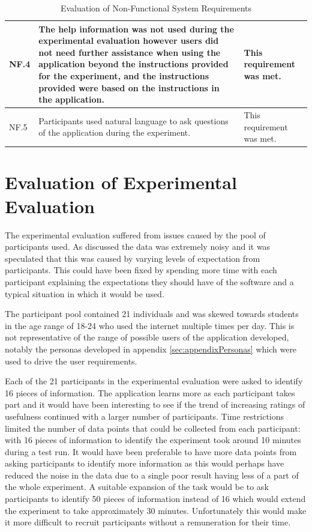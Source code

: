 \documentclass[authoryearcitations]{UoYCSproject}
\begin{document}
\begin{table}[h]
\begin{tabular}{|p{0.7cm}|p{9cm}|p{4.0cm}|}
NF.4 & The help information was not used during the experimental evaluation however users did not need further assistance when using the application beyond the instructions provided for the experiment, and the instructions provided were based on the instructions in the application.                                                            & This requirement was met.     \\ \hline
NF.5 & Participants used natural language to ask questions of the application during the experiment.                                                                                                                                                                                                                                                  & This requirement was met.     \\ \hline
\end{tabular}
\caption{Evaluation of Non-Functional System Requirements}
\label{table:evalNonFunctionalReqs}
\end{table}

\section{Evaluation of Experimental Evaluation}
\label{sec:evalExperimentalEvaluation}

The experimental evaluation suffered from issues caused by the pool of participants used. As discussed the data was extremely noisy and it was speculated that this was caused by varying levels of expectation from participants. This could have been fixed by spending more time with each participant explaining the expectations they should have of the software and a typical situation in which it would be used. 

The participant pool contained 21 individuals and was skewed towards students in the age range of 18-24 who used the internet multiple times per day. This is not representative of the range of possible users of the application developed, notably the personas developed in appendix \ref{sec:appendixPersonas} which were used to drive the user requirements.

Each of the 21 participants in the experimental evaluation were asked to identify 16 pieces of information. The application learns more as each participant takes part and it would have been interesting to see if the trend of increasing ratings of usefulness continued with a larger number of participants. Time restrictions limited the number of data points that could be collected from each participant: with 16 pieces of information to identify the experiment took around 10 minutes during a test run. It would have been preferable to have more data points from asking participants to identify more information as this would perhaps have reduced the noise in the data due to a single poor result having less of a part of the whole experiment. A suitable expansion of the task would be to ask participants to identify 50 pieces of information instead of 16 which would extend the experiment to take approximately 30 minutes. Unfortunately this would make it more difficult to recruit participants without a remuneration for their time.
\end{document}
